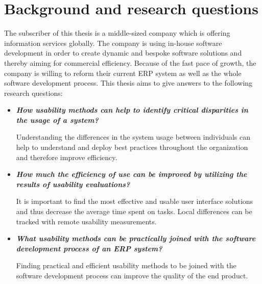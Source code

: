 \documentclass[12pt,a4paper,oneside,pdftex]{report}
\begin{document}
\section{Background and research questions}
\label{sec:background}
The subscriber of this thesis is a middle-sized company which is offering information services globally. The company is using in-house software development in order to create dynamic and bespoke software solutions and thereby aiming for commercial efficiency.  Because of the fast pace of growth, the company is willing to reform their current ERP system as well as the whole software development process. This thesis aims to give answers to the following research questions:

\begin{itemize}
\item \textbf{\emph{How usability methods can help to identify critical disparities in the usage of a system?}}

Understanding the differences in the system usage between individuals can help to understand and deploy best practices throughout the organization and therefore improve efficiency.

\item \textbf{\emph{How much the efficiency of use can be improved by utilizing the results of usability evaluations?}}

It is important to find the most effective and usable user interface solutions and thus decrease the average time spent on tasks. Local differences can be tracked with remote usability measurements.

\item \textbf{\emph{What usability methods can be practically joined with the software development process of an ERP system?}}

Finding practical and efficient usability methods to be joined with the software development process can improve the quality of the end product.

\end{itemize}



\end{document}
